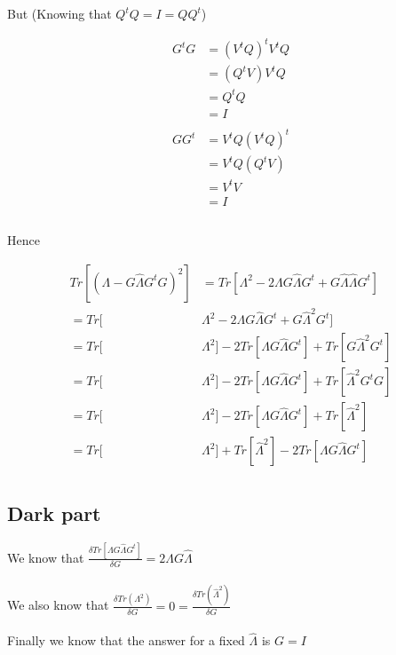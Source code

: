 \documentclass[12pt,journal]{IEEEtran}
\begin{document}
    But (Knowing that $Q^tQ = I = QQ^t$)

    \begin{equation*}
        \begin{aligned}
            G^tG &= (V^tQ)^t V^tQ\\
                 &= (Q^tV) V^tQ\\
                 &= Q^tQ\\
                 &= I\\ \\
            GG^t &= V^tQ (V^tQ)^t\\
                 &= V^tQ (Q^tV)\\
                 &= V^tV\\
                 &= I\\ \\
        \end{aligned}
    \end{equation*}

    Hence

    \begin{equation*}
        \begin{aligned}
        Tr[(\Lambda - G \hat{\Lambda} G^t G)^2 ]
        &=
        Tr[\Lambda^2 - 2 \Lambda G \hat{\Lambda} G^t + G \hat{\Lambda} \hat{\Lambda} G^t]\\
        =
        Tr[&\Lambda^2 - 2 \Lambda G \hat{\Lambda} G^t + G \hat{\Lambda}^2 G^t]\\
        =
        Tr[&\Lambda^2]- 2 Tr[\Lambda G \hat{\Lambda} G^t] + Tr[G \hat{\Lambda}^2 G^t]\\
        =
        Tr[&\Lambda^2] - 2 Tr[\Lambda G \hat{\Lambda} G^t] + Tr[ \hat{\Lambda}^2 G^tG]\\
        =
        Tr[&\Lambda^2] - 2 Tr[\Lambda G \hat{\Lambda} G^t] + Tr[ \hat{\Lambda}^2]\\
        =
        Tr[&\Lambda^2] + Tr[ \hat{\Lambda}^2] - 2 Tr[\Lambda G \hat{\Lambda} G^t]\\
        \end{aligned}
    \end{equation*}

    \subsection{Dark part}

    We know that $\frac{\delta Tr[\Lambda G \hat{\Lambda} G^t]}{\delta G} = 2\Lambda G \hat{\Lambda}$\\\\
    We also know that $\frac{\delta Tr(\Lambda^2)}{\delta G} = 0 = \frac{\delta Tr(\hat{\Lambda}^2)}{\delta G}$\\\\
    Finally we know that the answer for a fixed $\hat{\Lambda}$ is $G=I$\\ \\
\end{document}
